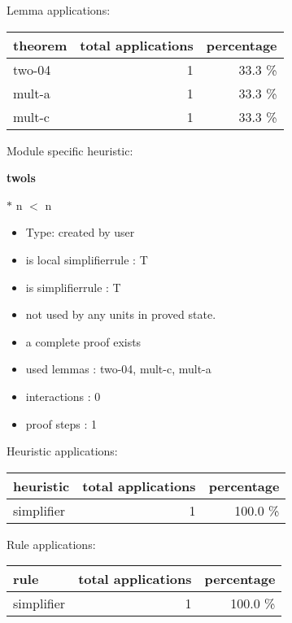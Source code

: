 \documentclass[a4paper]{article}
\begin{document}
Lemma applications:

\begin{supertabular}{l|r|r}
theorem	        & total applications & percentage \\ \hline
two-04 & 1 & 33.3 \% \\
mult-a & 1 & 33.3 \% \\
mult-c & 1 & 33.3 \% \\

\end{supertabular}

Module specific heuristic:

\pagebreak

{\LARGE\bf twols}\label{lemma-twols}

\medskip

 \Fol {} $*$ n $<$ n

\begin{itemize}

\item Type: created by user

\item is local simplifierrule : T
\item is simplifierrule : T
\item not used by any units in proved state.
\item       a complete proof exists
\item       used lemmas  : two-04, mult-c, mult-a
\item       interactions : 0
\item       proof steps  : 1
\end{itemize}

\medskip


Heuristic applications:

\begin{supertabular}{l|r|r}
heuristic	& total applications & percentage \\ \hline
simplifier & 1 & 100.0 \% \\

\end{supertabular}

Rule applications:

\begin{supertabular}{l|r|r}
rule	        & total applications & percentage \\ \hline
simplifier & 1 & 100.0 \% \\

\end{supertabular}
\end{document}
